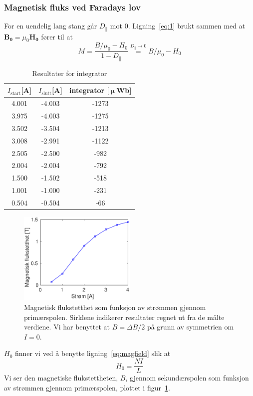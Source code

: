 \documentclass[a4paper,11pt, twocolumn]{article}
\begin{document}
\subsubsection{Magnetisk fluks ved Faradays lov}
For en uendelig lang stang går $D_\parallel$ mot 0. Ligning~\eqref{eq:1} brukt sammen med at $\mathbf{B_0} = \mu_0\mathbf{H_0}$ fører til at  
\begin{equation}
	M = \frac{B/\mu_0-H_0}{1-D_\parallel}\stackrel{D_\parallel\rightarrow 0}{=} B/\mu_0-H_0
	\label{eq:mag}
\end{equation}

\begin{table}
	\caption{Resultater for integrator}
	\label{tab:integrator}
	\centering
	\begin{tabular}{ccc}
		\toprule
		\toprule
		$I_\text{start}$[A] & $I_\text{slutt}$[A] & integrator $[\upmu$Wb]\\
		\toprule
		4.001&	-4.003&	-1273\\
		3.975&	-4.003&	-1275\\
		3.502&	-3.504&	-1213\\
		3.008&	-2.991&	-1122\\
		2.505&	-2.500&	-982 \\
		2.004&	-2.004&	-792 \\
		1.500&	-1.502&	-518 \\
		1.001&	-1.000&	-231 \\
		0.504&	-0.504&	-66  \\
		\toprule
	\end{tabular}
\end{table}
\begin{figure}[!ht]
	\centering
	\includegraphics[width = 0.5\textwidth]{matlab/bavi.eps}
	\caption{Magnetisk flukstetthet som funksjon av strømmen gjennom primærspolen. Sirklene indikerer resultater regnet ut fra de målte verdiene. Vi har benyttet at $B = \Delta B/2$ på grunn av symmetrien om $I=0$.}
	\label{fig:bavi}
\end{figure}
$H_0$ finner vi ved å benytte ligning~\eqref{eq:magfield} slik at
\begin{equation}
	H_0 = \frac{NI}{L}
	\label{eq:H0}
\end{equation}
Vi ser den magnetiske flukstettheten, $B$, gjennom sekundærspolen som funksjon av strømmen gjennom primærspolen, plottet i figur~\ref{fig:bavi}. 
\end{document}
